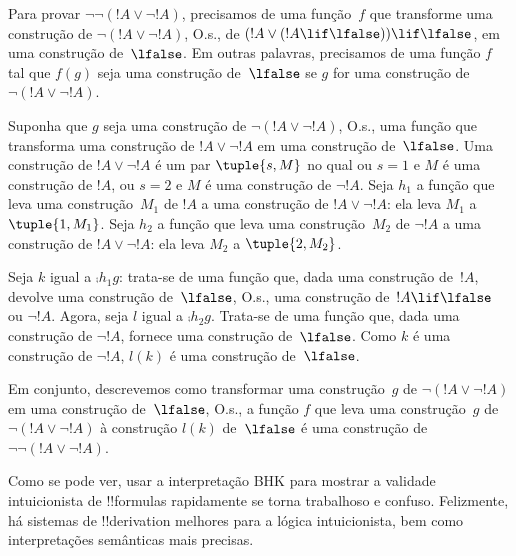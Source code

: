 \documentclass[../../../include/open-logic-section]{subfiles}
\begin{document}
\begin{ex}
Para provar $\lnot \lnot (!A \lor \lnot !A)$, precisamos de uma
função~$f$ que transforme uma construção de
$\lnot(!A \lor \lnot !A)$, O.s.\@, de $(!A \lor (!A \lif \lfalse))
\lif \lfalse$, em uma construção de~$\lfalse$. Em outras palavras,
precisamos de uma função $f$ tal que $f(g)$ seja uma construção
de~$\lfalse$ se $g$ for uma construção de
$\lnot(!A \lor \lnot !A)$.

Suponha que $g$ seja uma construção de $\lnot(!A \lor \lnot !A)$,
O.s.\@, uma função que transforma uma construção de
$!A \lor \lnot !A$ em uma construção de~$\lfalse$. Uma construção de
$!A \lor \lnot !A$ é um par $\tuple{s, M}$ no qual ou $s = 1$ e $M$
é uma construção de $!A$, ou $s = 2$ e $M$ é uma construção de
$\lnot !A$. Seja $h_1$ a função que leva uma construção~$M_1$ de $!A$
a uma construção de $!A \lor \lnot !A$: ela leva $M_1$ a
$\tuple{1, M_1}$. Seja $h_2$ a função que leva uma construção~$M_2$ de
$\lnot !A$ a uma construção de $!A \lor \lnot !A$: ela leva $M_2$ a
$\tuple{2, M_2}$.

Seja $k$ igual a $\comp{h_1}{g}$: trata-se de uma função que, dada uma
construção de~$!A$, devolve uma construção de~$\lfalse$, O.s.\@, uma
construção de~$!A \lif \lfalse$ ou $\lnot !A$. Agora, seja $l$ igual a
$\comp{h_2}{g}$. Trata-se de uma função que, dada uma construção de
$\lnot !A$, fornece uma construção de~$\lfalse$. Como $k$ é uma
construção de $\lnot !A$, $l(k)$ é uma construção de~$\lfalse$.

Em conjunto, descrevemos como transformar uma construção~$g$ de
$\lnot(!A \lor \lnot !A)$ em uma construção de~$\lfalse$, O.s.\@, a
função $f$ que leva uma construção~$g$ de
$\lnot(!A \lor \lnot !A)$ à construção $l(k)$ de~$\lfalse$ é uma
construção de $\lnot\lnot(!A \lor \lnot !A)$.
\end{ex}

Como se pode ver, usar a interpretação BHK para mostrar a validade
intuicionista de !!{formula}s rapidamente se torna trabalhoso e
confuso. Felizmente, há sistemas de !!{derivation} melhores para a
lógica intuicionista, bem como interpretações semânticas mais precisas.
\end{document}
